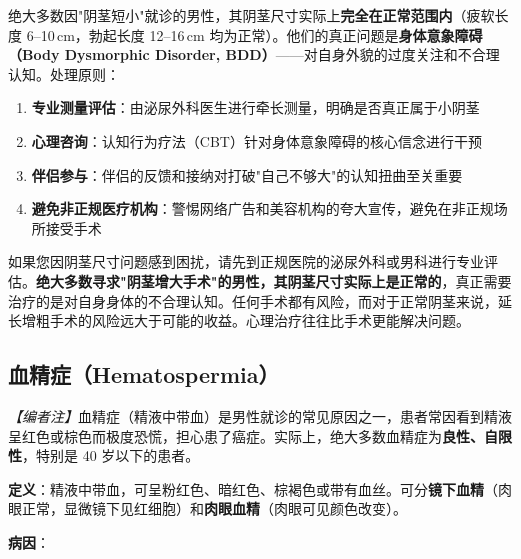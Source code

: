 绝大多数因"阴茎短小"就诊的男性，其阴茎尺寸实际上\textbf{完全在正常范围内}（疲软长度 6--10\,cm，勃起长度 12--16\,cm 均为正常）。他们的真正问题是\textbf{身体意象障碍（Body Dysmorphic Disorder, BDD）}——对自身外貌的过度关注和不合理认知。处理原则：
\begin{enumerate}
	\item \textbf{专业测量评估}：由泌尿外科医生进行牵长测量，明确是否真正属于小阴茎
	\item \textbf{心理咨询}：认知行为疗法（CBT）针对身体意象障碍的核心信念进行干预
	\item \textbf{伴侣参与}：伴侣的反馈和接纳对打破"自己不够大"的认知扭曲至关重要
	\item \textbf{避免非正规医疗机构}：警惕网络广告和美容机构的夸大宣传，避免在非正规场所接受手术
\end{enumerate}

\begin{tcolorbox}[colback=pink!5!white,colframe=red!50!black,title=贴心小叮咛]
如果您因阴茎尺寸问题感到困扰，请先到正规医院的泌尿外科或男科进行专业评估。\textbf{绝大多数寻求"阴茎增大手术"的男性，其阴茎尺寸实际上是正常的}，真正需要治疗的是对自身身体的不合理认知。任何手术都有风险，而对于正常阴茎来说，延长增粗手术的风险远大于可能的收益。心理治疗往往比手术更能解决问题。
\end{tcolorbox}

\subsection{血精症（Hematospermia）}
\label{subsec:hematospermia}

\noindent\textit{【编者注】}血精症（精液中带血）是男性就诊的常见原因之一，患者常因看到精液呈红色或棕色而极度恐慌，担心患了癌症。实际上，绝大多数血精症为\textbf{良性、自限性}，特别是 40 岁以下的患者。

\vspace{0.5em}
\noindent\textbf{定义}：精液中带血，可呈粉红色、暗红色、棕褐色或带有血丝。可分\textbf{镜下血精}（肉眼正常，显微镜下见红细胞）和\textbf{肉眼血精}（肉眼可见颜色改变）。

\vspace{0.5em}
\noindent\textbf{病因}：

